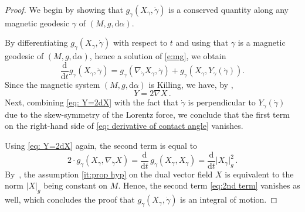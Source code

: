 \documentclass[11pt,reqno]{amsart}
\theoremstyle{plain}
\theoremstyle{definition}
\numberwithin{equation}{section}
\def\a{\alpha}
\def\d{\delta}
\def\a{\alpha}
\def\d{\delta}
\def\d{{\mathrm{d}}}
\begin{document}
\begin{proof}%
We begin by showing that \( g_{\gamma}(X_{\gamma}, \dot{\gamma}) \) is a conserved quantity along any magnetic geodesic \( \gamma \) of \( (M, g, \mathrm{d}\alpha) \).

By differentiating \( g_{\gamma}(X_{\gamma}, \dot{\gamma}) \) with respect to \(t\) and using that \(\gamma\) is a magnetic geodesic of \((M,g,\d\alpha)\), hence a solution of \eqref{e:mg}, we obtain
\begin{equation}\label{eq: derivative of contact angle}
    \frac{\mathrm{d}}{\mathrm{d} t} g_{\gamma}(X_{\gamma}, \dot{\gamma}) 
    = g_{\gamma}\left(\nabla_{\dot{\gamma}} X_{\gamma}, \dot{\gamma} \right) 
    + g_{\gamma}\left(X_{\gamma}, Y_{\gamma}(\dot{\gamma}) \right).
\end{equation}
Since the magnetic system \((M,g,\d\alpha)\) is Killing, we have, by \cite[S.
2.2]{ABM},
\begin{equation}\label{eq: Y=2dX}
    Y = 2\nabla X \, .
\end{equation}
Next, combining \eqref{eq: Y=2dX} with the fact that $\dot{\gamma}$ is perpendicular to $Y_\gamma(\dot{\gamma}) $ due to the skew-symmetry of the Lorentz force, we conclude that the first term on the right-hand side of \eqref{eq: derivative of contact angle} vanishes.

Using \eqref{eq: Y=2dX} again, the second term is equal to
\begin{equation}\label{eq:2nd term}
2 \cdot g_{\gamma}(X_{\gamma}, \nabla_{\dot{\gamma}} X) = \frac{\mathrm{d}}{\mathrm{d}t} \, g_{\gamma}(X_{\gamma}, X_{\gamma}) = \frac{\mathrm{d}}{\mathrm{d}t} \lvert X_{\gamma} \rvert_g^2 \, .
\end{equation}
By~\cite[Lemma 2.2]{ABM}, the assumption \eqref{it:prop hyp} on the dual vector field $X$ is equivalent to the norm \( \lvert X \rvert_g \) being constant on $M$.
Hence, the second term \eqref{eq:2nd term} vanishes as well, which concludes the proof that $g_{\gamma}(X_{\gamma}, \dot{\gamma})$ is an integral of motion.
\medskip


\end{proof}
\end{document}
